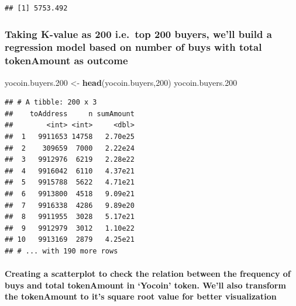 \documentclass[]{article}
\newenvironment{Shaded}{\begin{snugshade}}{\end{snugshade}}
\newcommand{\KeywordTok}[1]{\textcolor[rgb]{0.13,0.29,0.53}{\textbf{#1}}}
\newcommand{\DecValTok}[1]{\textcolor[rgb]{0.00,0.00,0.81}{#1}}
\newcommand{\StringTok}[1]{\textcolor[rgb]{0.31,0.60,0.02}{#1}}
\newcommand{\NormalTok}[1]{#1}
\let\oldparagraph\paragraph
\renewcommand{\paragraph}[1]{\oldparagraph{#1}\mbox{}}
\begin{document}
\begin{verbatim}
## [1] 5753.492
\end{verbatim}

\subsubsection{Taking K-value as 200 i.e.~top 200 buyers, we'll build a
regression model based on number of buys with total tokenAmount as
outcome}\label{taking-k-value-as-200-i.e.top-200-buyers-well-build-a-regression-model-based-on-number-of-buys-with-total-tokenamount-as-outcome}

\begin{Shaded}
\begin{Highlighting}[]
\NormalTok{yocoin.buyers.}\DecValTok{200}\NormalTok{ <-}\StringTok{ }\KeywordTok{head}\NormalTok{(yocoin.buyers,}\DecValTok{200}\NormalTok{)}
\NormalTok{yocoin.buyers.}\DecValTok{200}
\end{Highlighting}
\end{Shaded}

\begin{verbatim}
## # A tibble: 200 x 3
##    toAddress     n sumAmount
##        <int> <int>     <dbl>
##  1   9911653 14758   2.70e25
##  2    309659  7000   2.22e24
##  3   9912976  6219   2.28e22
##  4   9916042  6110   4.37e21
##  5   9915788  5622   4.71e21
##  6   9913800  4518   9.09e21
##  7   9916338  4286   9.89e20
##  8   9911955  3028   5.17e21
##  9   9912979  3012   1.10e22
## 10   9913169  2879   4.25e21
## # ... with 190 more rows
\end{verbatim}

\paragraph{\texorpdfstring{Creating a scatterplot to check the relation
between the frequency of buys and total tokenAmount in `Yocoin' token.
We'll also transform the tokenAmount to it's square root value for
better
visualization}{Creating a scatterplot to check the relation between the frequency of buys and total tokenAmount in Yocoin token. We'll also transform the tokenAmount to it's square root value for better visualization}}\label{creating-a-scatterplot-to-check-the-relation-between-the-frequency-of-buys-and-total-tokenamount-in-yocoin-token.-well-also-transform-the-tokenamount-to-its-square-root-value-for-better-visualization-1}
\end{document}
